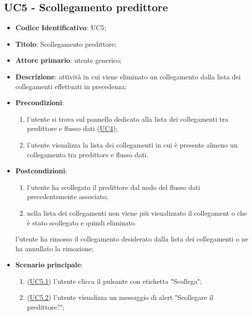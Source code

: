 
\label{par:UC5}
	\subsection{UC5 - Scollegamento predittore}
	
	

		\begin{itemize}
			\item\textbf{Codice Identificativo}: UC5;
			\item\textbf{Titolo}: Scollegamento predittore;
			\item\textbf{Attore primario}: utente generico;
			\item\textbf{Descrizione}: attività in cui viene eliminato un collegamento dalla lista dei collegamenti effettuati in precedenza;
			\item\textbf{Precondizioni}:
			\begin{enumerate}
			\item l'utente si trova sul pannello dedicato alla lista dei collegamenti tra predittore e
flusso dati (\hyperref[par:UC4]{UC4});
			\item  l'utente visualizza la lista dei collegamenti in cui è presente almeno un collegamento tra predittore e flusso dati.	
\end{enumerate}			
			\item\textbf{Postcondizioni}: 
			\begin{enumerate}
				\item l'utente ha scollegato il predittore dal nodo del flusso dati precedentemente associato;
				\item nella lista dei collegamenti non viene più visualizzato il collegament
				o che è stato
scollegato e quindi eliminato.
			\end{enumerate}
			l'utente ha rimosso il collegamento desiderato dalla lista dei collegamenti o ne ha annullato la rimozione;
			\item\textbf{Scenario principale}:
			\begin{enumerate}
				\item (\hyperref[par:UC5.1]{UC5.1}) l'utente clicca il pulsante con etichetta "Scollega";
				\item (\hyperref[par:UC5.2]{UC5.2}) l'utente visualizza un messaggio di alert "Scollegare il predittore?";

\end{enumerate}
\end{itemize}
